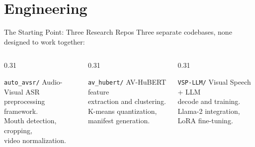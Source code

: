 
\section{Engineering}

\begin{frame}{The Starting Point: Three Research Repos}
  \vspace{2pt}
  {\small Three separate codebases, \alert{none designed to work together}:}

  \vspace{6pt}

  \begin{columns}[T]
    \begin{column}{0.31\textwidth}
      \begin{block}{\small \texttt{auto\_avsr/}}
        {\scriptsize Audio-Visual ASR\\preprocessing framework.\\[3pt]
        Mouth detection, cropping,\\video normalization.\\[3pt]
        }
      \end{block}
    \end{column}
    \begin{column}{0.31\textwidth}
      \begin{block}{\small \texttt{av\_hubert/}}
        {\scriptsize AV-HuBERT feature\\extraction and clustering.\\[3pt]
        K-means quantization,\\manifest generation.\\[3pt]
        }
      \end{block}
    \end{column}
    \begin{column}{0.31\textwidth}
      \begin{block}{\small \texttt{VSP-LLM/}}
        {\scriptsize Visual Speech + LLM\\decode and training.\\[3pt]
        Llama-2 integration,\\LoRA fine-tuning.\\[3pt]
        }
      \end{block}
    \end{column}
  \end{columns}


\end{frame}
